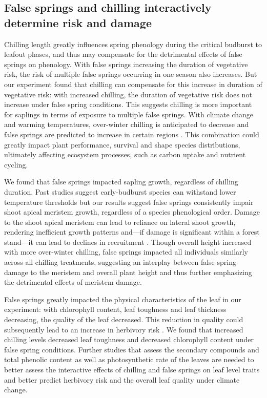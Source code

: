 \documentclass{article}\usepackage[]{graphicx}\usepackage[]{color}
\begin{document}
\subsection*{False springs and chilling interactively determine risk and damage}
Chilling length greatly influences spring phenology during the critical budburst to leafout phases, and thus may compensate for the detrimental effects of false springs on phenology. With false springs increasing the duration of vegetative risk, the risk of multiple false springs occurring in one season also increases. But our experiment found that chilling can compensate for this increase in duration of vegetative risk: with increased chilling, the duration of vegetative risk does not increase under false spring conditions. This suggests chilling is more important for saplings in terms of exposure to multiple false springs. With climate change and warming temperatures, over-winter chilling is anticipated to decrease \citep{Laube2014} and false springs are predicted to increase in certain regions \citep{Ault2015, Liu2018}. This combination could greatly impact plant performance, survival and shape species distributions, ultimately affecting ecosystem processes, such as carbon uptake and nutrient cycling.
 
We found that false springs impacted sapling growth, regardless of chilling duration. Past studies suggest early-budburst species can withstand lower temperature thresholds \citep{Lenz2013, Muffler2016, Zohner2020} but our results suggest false springs consistently impair shoot apical meristem growth, regardless of a species phenological order. Damage to the shoot apical meristem can lead to reliance on lateral shoot growth, rendering inefficient growth patterns and---if damage is significant within a forest stand---it can lead to declines in recruitment \citep{Rhodes2018}. Though overall height increased with more over-winter chilling, false springs impacted all individuals similarly across all chilling treatments, suggesting an interplay between false spring damage to the meristem and overall plant height and thus further emphasizing the detrimental effects of meristem damage.   
  
False springs greatly impacted the physical characteristics of the leaf in our experiment: with chlorophyll content, leaf toughness and leaf thickness decreasing, the quality of the leaf decreased. This reduction in quality could subsequently lead to an increase in herbivory risk \citep{Onoda2011}. We found that increased chilling levels decreased leaf toughness and decreased chlorophyll content under false spring conditions. Further studies that assess the secondary compounds and total phenolic content \citep{Ayres1993, Webber2016} as well as photosynthetic rate of the leaves are needed to better assess the interactive effects of chilling and false springs on leaf level traits and better predict herbivory risk and the overall leaf quality under climate change. 
\end{document}

